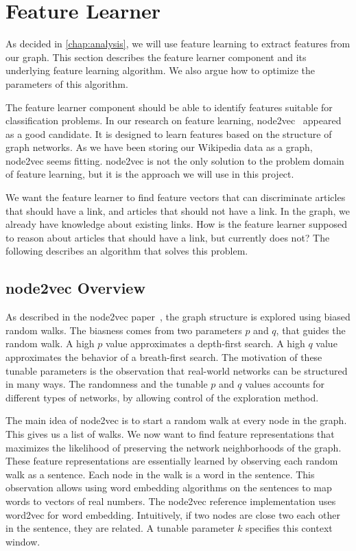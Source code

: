 \section{Feature Learner}
As decided in \cref{chap:analysis}, we will use feature learning to extract features from our graph. This section describes the feature learner component and its underlying feature learning algorithm. We also argue how to optimize the parameters of this algorithm.

The feature learner component should be able to identify features suitable for classification problems. In our research on feature learning, node2vec~\cite{node2vec} appeared as a good candidate. It is designed to learn features based on the structure of graph networks. As we have been storing our Wikipedia data as a graph, node2vec seems fitting. node2vec is not the only solution to the problem domain of feature learning, but it is the approach we will use in this project.

We want the feature learner to find feature vectors that can discriminate articles that should have a link, and articles that should not have a link. In the graph, we already have knowledge about existing links. How is the feature learner supposed to reason about articles that should have a link, but currently does not? The following describes an algorithm that solves this problem.

\subsection{node2vec Overview}
As described in the node2vec paper~\cite{node2vec}, the graph structure is explored using biased random walks. The biasness comes from two parameters $p$ and $q$, that guides the random walk. A high $p$  value approximates a depth-first search. A high $q$  value approximates the behavior of a breath-first search. The motivation of these tunable parameters is the observation that real-world networks can be structured in many ways. The randomness and the tunable $p$ and $q$ values accounts for different types of networks, by allowing control of the exploration method.

The main idea of node2vec is to start a random walk at every node in the graph. This gives us a list of walks. We now want to find feature representations that maximizes the likelihood of preserving the network neighborhoods of the graph. These feature representations are essentially learned by observing each random walk as a sentence. Each node in the walk is a word in the sentence. This observation allows using word embedding algorithms on the sentences to map words to vectors of real numbers. The node2vec reference implementation uses word2vec for word embedding. Intuitively, if two nodes are close two each other in the sentence, they are related. A tunable parameter $k$ specifies this context window. 

